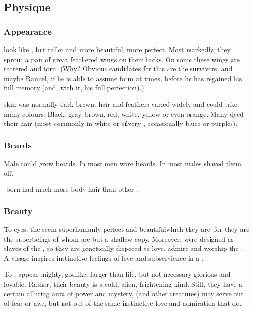 \subsection{Physique}





\subsubsection{Appearance}
\Resphain{} look like \humans, but taller and more beautiful, more perfect. 
Most markedly, they sprout a pair of great feathered wings on their backs. 
On some \resphain{} these wings are tattered and torn. 
(Why? 
Obvious candidates for this are the \Kezeradi{} survivors, and maybe Ramiel, if he is able to assume \resphan{} form at times, before he has regained his full memory (and, with it, his full perfection).)

\Resphan skin was normally dark brown. 
\Resphan hair and feathers varied widely and could take many colours: Black, gray, brown, red, white, yellow or even orange.
Many dyed their hair (most commonly in white or silvery \colours, occasionally blues or purples). 





\subsubsection{Beards}
Male \resphain could grow beards. 
In \Mystraacht most men wore beards. 
In \CiriathSepher most males shaved them off. 

\Nephil-born  had much more body hair than other \resphain.





\subsubsection{Beauty}
To \human{} eyes, the \resphain{} seem superhumanly perfect and beautiful\dash which they are, for they are the superbeings of whom \humans{} are but a shallow copy. 
Moreover, \humans{} were designed as slaves of the \resphain, so they are genetically disposed to love, admire and worship the \resphain. 
A \resphan{} visage inspires instinctive feelings of love and subservience in a \human. 

To \nephilim, \resphain{} appear mighty, godlike, larger-than-life, but not necessary glorious and lovable. 
Rather, their beauty is a cold, alien, frightening kind. 
Still, they have a certain alluring aura of power and mystery, 
\Nephilim{} (and other creatures) may serve \resphain{} out of fear or awe, but not out of the same instinctive love and admiration that \humans{} do. 





